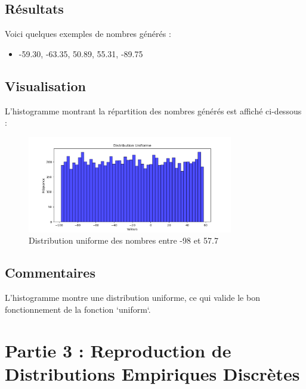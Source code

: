 \documentclass[a4paper,12pt]{report}
\begin{document}
\subsection*{Résultats}
Voici quelques exemples de nombres générés :

\begin{itemize}
    \item -59.30, -63.35, 50.89, 55.31, -89.75
\end{itemize}

\subsection*{Visualisation}
L'histogramme montrant la répartition des nombres générés est affiché ci-dessous :

\begin{figure}[h!]
    \centering
    \includegraphics[width=0.8\textwidth]{1.png}
    \caption{Distribution uniforme des nombres entre -98 et 57.7}
\end{figure}

\subsection*{Commentaires}
L'histogramme montre une distribution uniforme, ce qui valide le bon fonctionnement de la fonction `uniform`.

\newpage
\section*{Partie 3 : Reproduction de Distributions Empiriques Discrètes}
\end{document}
